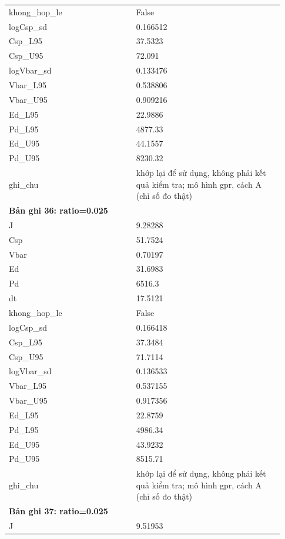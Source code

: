 \begin{longtable}{p{0.43\linewidth}p{0.50\linewidth}}
khong\_\allowbreak hop\_\allowbreak le & False \\
logCsp\_\allowbreak sd & 0.166512 \\
Csp\_\allowbreak L95 & 37.5323 \\
Csp\_\allowbreak U95 & 72.091 \\
logVbar\_\allowbreak sd & 0.133476 \\
Vbar\_\allowbreak L95 & 0.538806 \\
Vbar\_\allowbreak U95 & 0.909216 \\
Ed\_\allowbreak L95 & 22.9886 \\
Pd\_\allowbreak L95 & 4877.33 \\
Ed\_\allowbreak U95 & 44.1557 \\
Pd\_\allowbreak U95 & 8230.32 \\
ghi\_\allowbreak chu & khớp lại để sử dụng, không phải kết quả kiểm tra; mô hình gpr, cách A (chỉ số đo thật) \\
\midrule
\multicolumn{2}{p{0.95\linewidth}}{\textbf{Bản ghi 36: ratio=0.025}} \\
J & 9.28288 \\
Csp & 51.7524 \\
Vbar & 0.70197 \\
Ed & 31.6983 \\
Pd & 6516.3 \\
dt & 17.5121 \\
khong\_\allowbreak hop\_\allowbreak le & False \\
logCsp\_\allowbreak sd & 0.166418 \\
Csp\_\allowbreak L95 & 37.3484 \\
Csp\_\allowbreak U95 & 71.7114 \\
logVbar\_\allowbreak sd & 0.136533 \\
Vbar\_\allowbreak L95 & 0.537155 \\
Vbar\_\allowbreak U95 & 0.917356 \\
Ed\_\allowbreak L95 & 22.8759 \\
Pd\_\allowbreak L95 & 4986.34 \\
Ed\_\allowbreak U95 & 43.9232 \\
Pd\_\allowbreak U95 & 8515.71 \\
ghi\_\allowbreak chu & khớp lại để sử dụng, không phải kết quả kiểm tra; mô hình gpr, cách A (chỉ số đo thật) \\
\midrule
\multicolumn{2}{p{0.95\linewidth}}{\textbf{Bản ghi 37: ratio=0.025}} \\
J & 9.51953 \\

\end{longtable}
